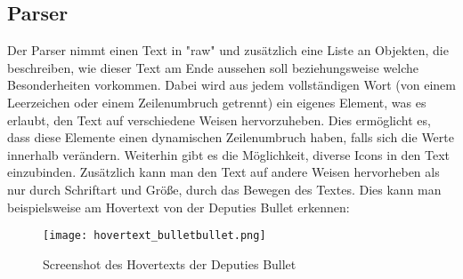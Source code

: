
\renewcommand{\kapitelautor}{Autor: Felix Zwickelstorfer}
\subsection{Parser}\label{subsec:parser}
\renewcommand{\kapitelautor}{Autor: Felix Zwickelstorfer}

Der Parser nimmt einen Text in "raw" und zusätzlich eine Liste an Objekten, die beschreiben, wie dieser Text am Ende aussehen soll beziehungsweise welche Besonderheiten vorkommen.
Dabei wird aus jedem vollständigen Wort (von einem Leerzeichen oder einem Zeilenumbruch getrennt) ein eigenes Element, was es erlaubt, den Text auf verschiedene Weisen hervorzuheben.
Dies ermöglicht es, dass diese Elemente einen dynamischen Zeilenumbruch haben, falls sich die Werte innerhalb verändern.
Weiterhin gibt es die Möglichkeit, diverse Icons in den Text einzubinden.
Zusätzlich kann man den Text auf andere Weisen hervorheben als nur durch Schriftart und Größe, \zB durch das Bewegen des Textes.
Dies kann man beispielsweise am Hovertext von der Deputies Bullet erkennen:
\begin{figure}[H]
    \centering
    \texttt{[image: hovertext\_bulletbullet.png]}
    \caption{Screenshot des Hovertexts der Deputies Bullet}
\end{figure}